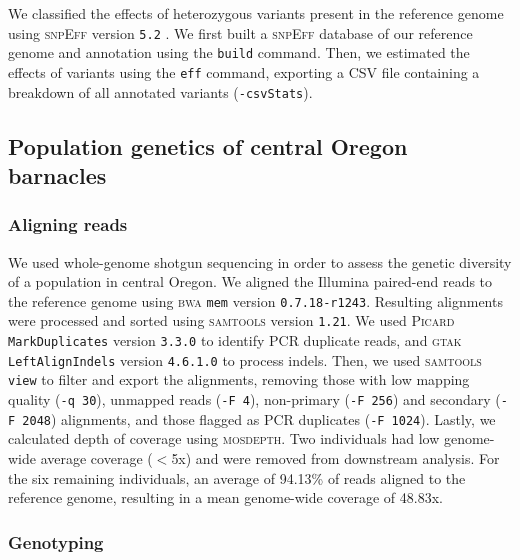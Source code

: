 We classified the effects of heterozygous variants present in the reference genome using
\textsc{snpEff} version \texttt{5.2} \citep{cingolani_program_2012}.
We first built a \textsc{snpEff} database of our \bgla{} reference genome and annotation
using the \texttt{build} command.
Then, we estimated the effects of variants using the \texttt{eff} command, exporting a
CSV file containing a breakdown of all annotated variants (\texttt{-csvStats}).

\subsection*{Population genetics of central Oregon barnacles}\label{sec:methods_popgen}

\subsubsection*{Aligning reads}

We used whole-genome shotgun sequencing in order to assess the genetic diversity of
a \bgla{} population in central Oregon.
We aligned the Illumina paired-end reads to the reference genome using \textsc{bwa}
\texttt{mem} version \texttt{0.7.18-r1243}.
Resulting alignments were processed and sorted using \textsc{samtools} version
\texttt{1.21}.
We used \textsc{Picard} \texttt{MarkDuplicates} version \texttt{3.3.0}
\citep{picard} to identify PCR duplicate reads, and
\textsc{gtak} \texttt{LeftAlignIndels} version \texttt{4.6.1.0}
\citep{mckenna_gatk_2010,depristo_framework_2011} to process indels.
Then, we used \textsc{samtools} \texttt{view} to filter and export the alignments,
removing those with low mapping quality (\texttt{-q 30}), unmapped reads (\texttt{-F 4}),
non-primary (\texttt{-F 256}) and secondary (\texttt{-F 2048}) alignments, and those
flagged as PCR duplicates (\texttt{-F 1024}).
Lastly, we calculated depth of coverage using \textsc{mosdepth}.
Two individuals had low genome-wide average coverage ($<$5x) and were removed from
downstream analysis.
For the six remaining individuals, an average of 94.13\% of reads aligned to the 
reference genome, resulting in a mean genome-wide coverage of 48.83x.

\subsubsection*{Genotyping}


